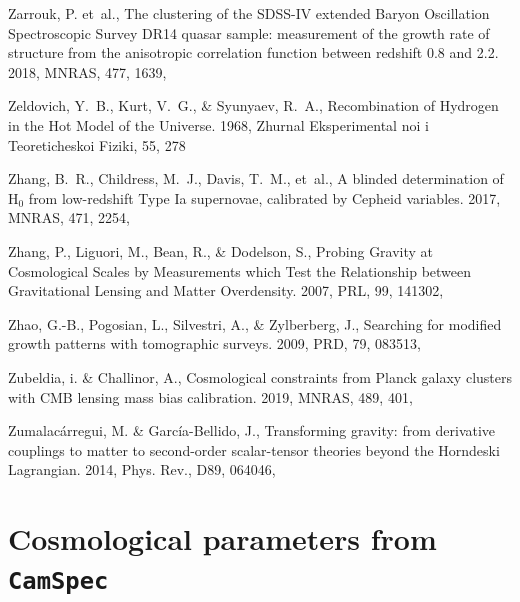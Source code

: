 \documentclass[longauth,traditabstract]{aa}
\def\mnras{{MNRAS}}
\def\prd{{PRD}}
\def\prl{{PRL}}
\begin{document}
\begin{thebibliography}{379}
Zarrouk, P. {et~al.}, {The clustering of the SDSS-IV extended Baryon
  Oscillation Spectroscopic Survey DR14 quasar sample: measurement of the
  growth rate of structure from the anisotropic correlation function between
  redshift 0.8 and 2.2}. 2018, \mnras, 477, 1639, 

{Zeldovich}, Y.~B., {Kurt}, V.~G., \& {Syunyaev}, R.~A., {Recombination of
  Hydrogen in the Hot Model of the Universe}. 1968, Zhurnal Eksperimental noi i
  Teoreticheskoi Fiziki, 55, 278

{Zhang}, B.~R., {Childress}, M.~J., {Davis}, T.~M., {et~al.}, {A blinded
  determination of H$_{0}$ from low-redshift Type Ia supernovae, calibrated by
  Cepheid variables}. 2017, \mnras, 471, 2254, 

Zhang, P., Liguori, M., Bean, R., \& Dodelson, S., {Probing Gravity at
  Cosmological Scales by Measurements which Test the Relationship between
  Gravitational Lensing and Matter Overdensity}. 2007, \prl, 99, 141302,

Zhao, G.-B., Pogosian, L., Silvestri, A., \& Zylberberg, J., {Searching for
  modified growth patterns with tomographic surveys}. 2009, \prd, 79, 083513,

Zubeldia, i. \& Challinor, A., {Cosmological constraints from Planck galaxy
  clusters with CMB lensing mass bias calibration}. 2019, \mnras, 489, 401,

Zumalacárregui, M. \& García-Bellido, J., {Transforming gravity: from
  derivative couplings to matter to second-order scalar-tensor theories beyond
  the Horndeski Lagrangian}. 2014, Phys. Rev., D89, 064046, 

\end{thebibliography}


\appendix
\section{Cosmological parameters from \texttt{\textbf{CamSpec}}}
\label{appendix:camspec}
\end{document}
